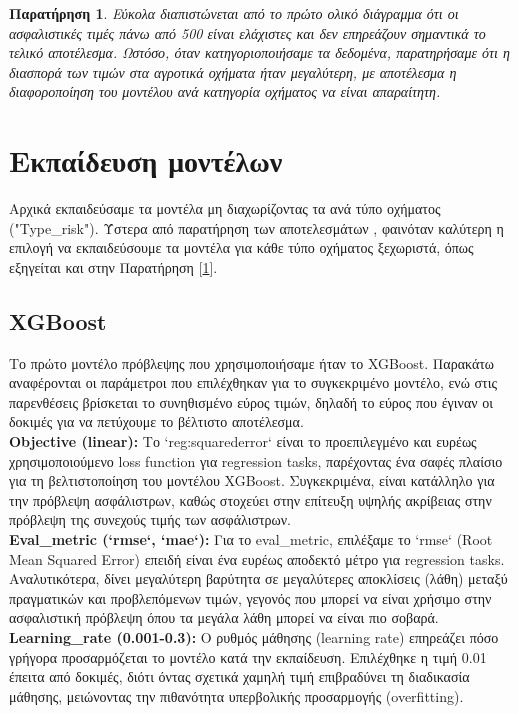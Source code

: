 \documentclass{llncs}
\newtheorem{observation}{Παρατήρηση}
\begin{document}
\begin{observation}
    \label{observation:first}
    Εύκολα διαπιστώνεται από το πρώτο ολικό διάγραμμα ότι οι ασφαλιστικές τιμές πάνω από 500 είναι ελάχιστες και δεν επηρεάζουν σημαντικά το τελικό αποτέλεσμα. Ωστόσο, όταν κατηγοριοποιήσαμε τα δεδομένα, παρατηρήσαμε ότι η διασπορά των τιμών στα αγροτικά οχήματα ήταν μεγαλύτερη, με αποτέλεσμα η διαφοροποίηση του μοντέλου ανά κατηγορία οχήματος να είναι απαραίτητη.
\end{observation}

\section{Εκπαίδευση μοντέλων}
Αρχικά εκπαιδεύσαμε τα μοντέλα μη διαχωρίζοντας τα ανά τύπο οχήματος ("Type\_risk"). Ύστερα από παρατήρηση των αποτελεσμάτων , φαινόταν καλύτερη η επιλογή να εκπαιδεύσουμε τα μοντέλα για κάθε τύπο οχήματος ξεχωριστά, όπως εξηγείται και στην Παρατήρηση [\ref{observation:first}].

\subsection{XGBoost}
Το πρώτο μοντέλο πρόβλεψης που χρησιμοποιήσαμε ήταν το XGBoost. Παρακάτω αναφέρονται οι παράμετροι που επιλέχθηκαν για το συγκεκριμένο μοντέλο, ενώ στις παρενθέσεις βρίσκεται το συνηθισμένο εύρος τιμών, δηλαδή το εύρος που έγιναν οι δοκιμές για να πετύχουμε το βέλτιστο αποτέλεσμα.\\

\noindent \textbf{Objective (linear):}
Το `reg:squarederror` είναι το προεπιλεγμένο και ευρέως χρησιμοποιούμενο loss function για regression tasks, παρέχοντας ένα σαφές πλαίσιο για τη βελτιστοποίηση του μοντέλου XGBoost. Συγκεκριμένα, είναι κατάλληλο για την πρόβλεψη ασφάλιστρων, καθώς στοχεύει στην επίτευξη υψηλής ακρίβειας στην πρόβλεψη της συνεχούς τιμής των ασφάλιστρων. \\

\noindent \textbf{Eval\_metric (`rmse`, `mae`):}
Για το eval\_metric, επιλέξαμε το `rmse` (Root Mean Squared Error) επειδή είναι ένα ευρέως αποδεκτό μέτρο για regression tasks. Αναλυτικότερα, δίνει μεγαλύτερη βαρύτητα σε μεγαλύτερες αποκλίσεις (λάθη) μεταξύ πραγματικών και προβλεπόμενων τιμών, γεγονός που μπορεί να είναι χρήσιμο στην ασφαλιστική πρόβλεψη όπου τα μεγάλα λάθη μπορεί να είναι πιο σοβαρά.\\

\noindent \textbf{Learning\_rate (0.001-0.3):}
Ο ρυθμός μάθησης (learning rate) επηρεάζει πόσο γρήγορα προσαρμόζεται το μοντέλο κατά την εκπαίδευση. Επιλέχθηκε η τιμή 0.01 έπειτα από δοκιμές, διότι όντας σχετικά χαμηλή τιμή επιβραδύνει τη διαδικασία μάθησης, μειώνοντας την πιθανότητα υπερβολικής προσαρμογής (overfitting).\\
\end{document}
